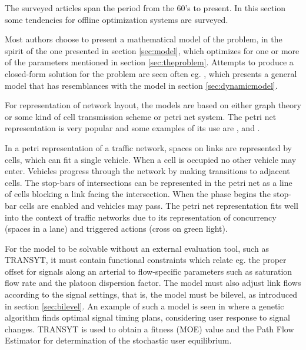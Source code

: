 \label{sec:offline}

The surveyed articles span the period from the 60's to present. In
this section some tendencies for offline optimization systems are
surveyed.

Most authors choose to present a mathematical model of the problem, in
the spirit of the one presented in section \ref{sec:model}, which
optimizes for one or more of the parameters mentioned in section
\ref{sec:theproblem}. Attempts to produce a closed-form solution for the
problem are seen often eg. \cite{36}, which presents a general model
that has resemblances with the model in section \ref{sec:dynamicmodel}.

For representation of network layout, the models are based on either
graph theory or some kind of cell transmission scheme or petri net
system. The petri net representation is very popular and some examples
of its use are \cite{12}, \cite{16} and \cite{petri}.

In a petri representation of a traffic network, spaces on links are
represented by cells, which can fit a single vehicle. When a cell is
occupied no other vehicle may enter. Vehicles progress through the
network by making transitions to adjacent cells. The stop-bars of
intersections can be represented in the petri net as a line of cells
blocking a link facing the intersection. When the phase begins the
stop-bar cells are enabled and vehicles may pass.  The petri net
representation fits well into the context of traffic networks due to
its representation of concurrency (spaces in a lane) and triggered
actions (cross on green light).

For the model to be solvable without an external evaluation tool, such
as TRANSYT, it must contain functional constraints which relate
eg. the proper offset for signals along an arterial to flow-specific
parameters such as saturation flow rate and the platoon dispersion
factor.  The model must also adjust link flows according to the signal
settings, that is, the model must be bilevel, as introduced in section
\ref{sec:bilevel}. An example of such a model is seen in \cite{33} where a
genetic algorithm finds optimal signal timing plans, considering user
response to signal changes. TRANSYT is used to obtain a fitness (MOE)
value and the Path Flow Estimator for determination of the stochastic
user equilibrium.

